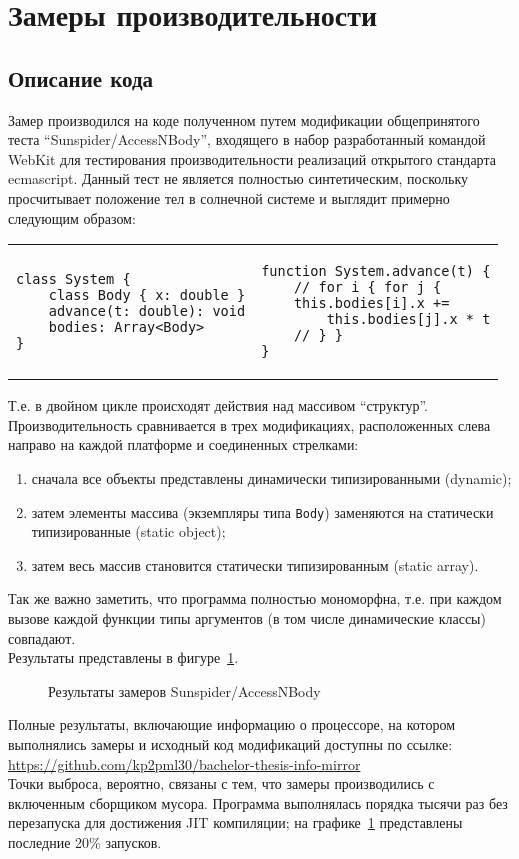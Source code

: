 \documentclass[times,specification,annotation]{itmo-student-thesis}
\begin{document}
\section{Замеры производительности}\label{sec:sunspider}
\subsection{Описание кода}
Замер производился на коде полученном путем модификации общепринятого теста ``Sunspider/AccessNBody'', входящего в набор разработанный командой WebKit для тестирования производительности реализаций открытого стандарта ecmascript. Данный тест не является полностью синтетическим, поскольку просчитывает положение тел в солнечной системе и выглядит примерно следующим образом:\\
\begin{center}
\begin{tabular}[t]{p{}|p{}}
\begin{lstlisting}
class System {
	class Body { x: double }
	advance(t: double): void
	bodies: Array<Body>
}
\end{lstlisting} &
\begin{lstlisting}
function System.advance(t) {
	// for i { for j {
	this.bodies[i].x +=
		this.bodies[j].x * t
	// } }
}
\end{lstlisting}
\end{tabular}
\end{center}

Т.е. в двойном цикле происходят действия над массивом ``структур''. Производительность сравнивается в трех модификациях, расположенных слева направо на каждой платформе и соединенных стрелками:
\begin{enumerate}
	\item сначала все объекты представлены динамически типизированными (dynamic);
	\item затем элементы массива (экземпляры типа \texttt{Body}) заменяются на статически типизированные (static object);
	\item затем весь массив становится статически типизированным (static array).
\end{enumerate}
Так же важно заметить, что программа полностью мономорфна, т.е. при каждом вызове каждой функции типы аргументов (в том числе динамические классы) совпадают.\\
Результаты представлены в фигуре~\ref{fig:accessnbodyres}.
\begin{figure}[!h]
	\caption{Результаты замеров Sunspider/AccessNBody}\label{fig:accessnbodyres}
	\resizebox{\textwidth}{!}{}
\end{figure}
Полные результаты, включающие информацию о процессоре, на котором выполнялись замеры и исходный код модификаций доступны по ссылке: \url{https://github.com/kp2pml30/bachelor-thesis-info-mirror}\\
Точки выброса, вероятно, связаны с тем, что замеры производились с включенным сборщиком мусора. Программа выполнялась порядка тысячи раз без перезапуска для достижения JIT компиляции; на графике~\ref{fig:accessnbodyres} представлены последние 20\% запусков.
\end{document}
